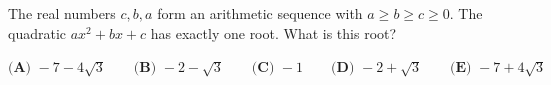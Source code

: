 The real numbers $c,b,a$ form an arithmetic sequence with $a\ge b\ge c\ge0$. The quadratic $ax^2+bx+c$ has exactly one root. What is this root?

$\textbf{(A) }-7-4\sqrt3\qquad\textbf{(B) }-2-\sqrt3\qquad\textbf{(C) }-1\qquad\textbf{(D) }-2+\sqrt3\qquad\textbf{(E) }-7+4\sqrt3$
